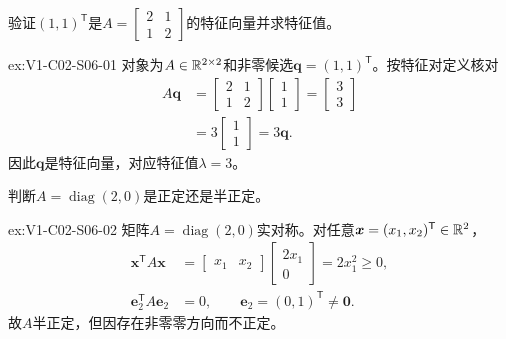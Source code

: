\begin{SLChapterExercisePairSection}
\begin{exercise}[特征对]\label{ex:V1-C02-S06-01}
验证$(1,1)^{\mathsf T}$是$A=\begin{bmatrix}2&1\\1&2\end{bmatrix}$的特征向量并求特征值。
\end{exercise}
\label{sol:V1-C02-S06-01}
\begin{chapterexercisesolution}{ex:V1-C02-S06-01}
对象为$A\in\mathbb{R}^{2\times2}$和非零候选$\boldsymbol q=(1,1)^{\mathsf T}$。按特征对定义核对
\[
\begin{aligned}
A\boldsymbol q
&=\begin{bmatrix}2&1\\1&2\end{bmatrix}
\begin{bmatrix}1\\1\end{bmatrix}
=\begin{bmatrix}3\\3\end{bmatrix}\\
&=3\begin{bmatrix}1\\1\end{bmatrix}=3\boldsymbol q.
\end{aligned}
\]
因此$\boldsymbol q$是特征向量，对应特征值$\lambda=3$。
\end{chapterexercisesolution}

\begin{exercise}[正定判断]\label{ex:V1-C02-S06-02}
判断$A=\operatorname{diag}(2,0)$是正定还是半正定。
\end{exercise}
\label{sol:V1-C02-S06-02}
\begin{chapterexercisesolution}{ex:V1-C02-S06-02}
矩阵$A=\operatorname{diag}(2,0)$实对称。对任意$\boldsymbol x=(x_1,x_2)^{\mathsf T}\in\mathbb{R}^2$，
\[
\begin{aligned}
\boldsymbol x^{\mathsf T}A\boldsymbol x
&=\begin{bmatrix}x_1&x_2\end{bmatrix}
\begin{bmatrix}2x_1\\0\end{bmatrix}=2x_1^2\ge0,\\
\boldsymbol e_2^{\mathsf T}A\boldsymbol e_2
&=0,\qquad \boldsymbol e_2=(0,1)^{\mathsf T}\ne\boldsymbol0.
\end{aligned}
\]
故$A$半正定，但因存在非零零方向而不正定。
\end{chapterexercisesolution}


\end{SLChapterExercisePairSection}
